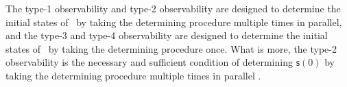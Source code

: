  
The type-1 observability and type-2 observability are designed to determine the initial states of \BCNs\ by taking the determining procedure multiple times in parallel, and the type-3 and type-4 observability are designed to determine the initial states of \BCNs\ by taking the determining procedure once. What is more, the type-2 observability is the necessary and sufficient condition of determining $\mathsf{s}(0)$ by taking the determining procedure multiple times in parallel \cite{Zhao2010Input}.


